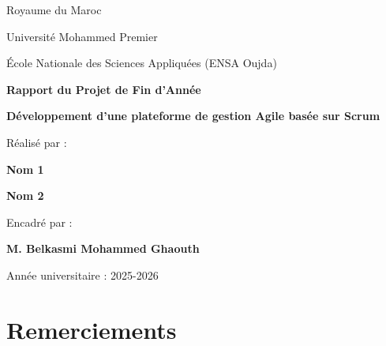 \documentclass[12pt,a4paper]{report}
\begin{document}

\begin{titlepage}

\begin{center}

{\Large Royaume du Maroc}

\vspace{0.5cm}

{\Large Université Mohammed Premier}

\vspace{0.5cm}

{\Large École Nationale des Sciences Appliquées (ENSA Oujda)}

\vspace{2cm}

{\Huge \textbf{Rapport du Projet de Fin d'Année}}

\vspace{1cm}

{\Large \textbf{Développement d'une plateforme de gestion Agile basée sur Scrum}}

\vspace{2.5cm}

Réalisé par :

\vspace{0.5cm}

\textbf{Nom 1}

\textbf{Nom 2}

\vfill

Encadré par :

\vspace{0.5cm}

\textbf{M. Belkasmi Mohammed Ghaouth}

\vspace{1.5cm}

Année universitaire : 2025-2026

\end{center}

\end{titlepage}


\chapter*{Remerciements}
\end{document}
